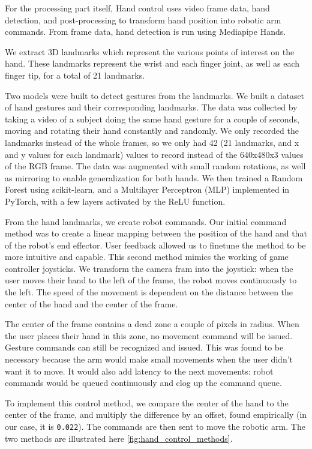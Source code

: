 For the processing part itself, Hand control uses video frame data, hand detection, and post-processing to transform hand position into robotic arm commands. From frame data, hand detection is run using Mediapipe Hands\cite{mediapipe_hands}.

We extract 3D landmarks which represent the various points of interest on the hand. These landmarks represent the wrist and each finger joint, as well as each finger tip, for a total of 21 landmarks.

Two models were built to detect gestures from the landmarks. We built a dataset of hand gestures and their corresponding landmarks. The data was collected by taking a video of a subject doing the same hand gesture for a couple of seconds, moving and rotating their hand constantly and randomly. We only recorded the landmarks instead of the whole frames, so we only had 42 (21 landmarks, and x and y values for each landmark) values to record instead of the 640x480x3 values of the RGB frame. The data was augmented with small random rotations, as well as mirroring to enable generalization for both hands. We then trained a Random Forest using scikit-learn\cite{scikit-learn}, and a Multilayer Perceptron (MLP) implemented in PyTorch, with a few layers activated by the ReLU function.

From the hand landmarks, we create robot commands. Our initial command method was to create a linear mapping between the position of the hand and that of the robot's end effector. User feedback allowed us to finetune the method to be more intuitive and capable. This second method mimics the working of game controller joysticks. We transform the camera fram into the joystick: when the user moves their hand to the left of the frame, the robot moves continuously to the left. The speed of the movement is dependent on the distance between the center of the hand and the center of the frame.

The center of the frame contains a dead zone a couple of pixels in radius. When the user places their hand in this zone, no movement command will be issued. Gesture commands can still be recognized and issued. This was found to be necessary because the arm would make small movements when the user didn't want it to move. It would also add latency to the next movements: robot commands would be queued continuously and clog up the command queue.

To implement this control method, we compare the center of the hand to the center of the frame, and multiply the difference by an offset, found empirically (in our case, it is \lstinline{0.022}). The commands are then sent to move the robotic arm. The two methods are illustrated here \ref{fig:hand_control_methods}.

